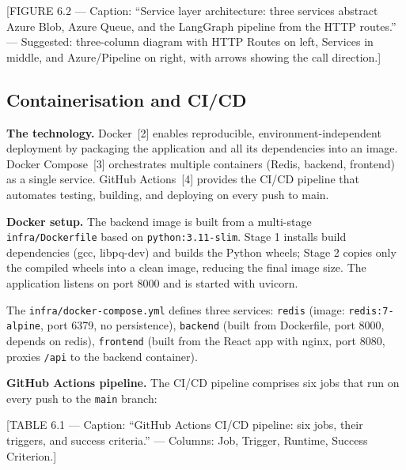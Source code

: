 [FIGURE 6.2 --- Caption: ``Service layer architecture: three services abstract
Azure Blob, Azure Queue, and the LangGraph pipeline from the HTTP routes.''
--- Suggested: three-column diagram with HTTP Routes on left, Services in
middle, and Azure/Pipeline on right, with arrows showing the call direction.]

\subsection{Containerisation and CI/CD}
\label{subsec:docker}

\textbf{The technology.} Docker~[2] enables reproducible, environment-independent
deployment by packaging the application and all its dependencies into an image.
Docker Compose~[3] orchestrates multiple containers (Redis, backend, frontend)
as a single service. GitHub Actions~[4] provides the CI/CD pipeline that
automates testing, building, and deploying on every push to main.

\textbf{Docker setup.} The backend image is built from a multi-stage
\texttt{infra/Dockerfile} based on \texttt{python:3.11-slim}. Stage 1 installs
build dependencies (gcc, libpq-dev) and builds the Python wheels; Stage 2
copies only the compiled wheels into a clean image, reducing the final image
size. The application listens on port 8000 and is started with uvicorn.

The \texttt{infra/docker-compose.yml} defines three services:
\texttt{redis} (image: \texttt{redis:7-alpine}, port 6379, no persistence),
\texttt{backend} (built from Dockerfile, port 8000, depends on redis),
\texttt{frontend} (built from the React app with nginx, port 8080, proxies
\texttt{/api} to the backend container).

\textbf{GitHub Actions pipeline.} The CI/CD pipeline comprises six jobs that
run on every push to the \texttt{main} branch:

[TABLE 6.1 --- Caption: ``GitHub Actions CI/CD pipeline: six jobs, their
triggers, and success criteria.'' --- Columns: Job, Trigger, Runtime, Success
Criterion.]

